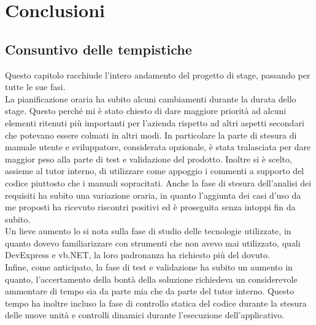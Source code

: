 
\chapter{Conclusioni}
\label{cap:conclusioni}
\section{Consuntivo delle tempistiche}
Questo capitolo racchiude l'intero andamento del progetto di stage, passando per tutte le sue fasi.\\
La pianificazione oraria ha subito alcuni cambiamenti durante la durata dello stage. Questo perché mi è stato chiesto di dare maggiore priorità ad alcuni elementi ritenuti 
più importanti per l'azienda rispetto ad altri aspetti secondari che potevano essere colmati in altri modi. In particolare la parte di stesura di manuale utente e sviluppatore,
considerata opzionale, è stata tralasciata per dare maggior peso alla parte di test e validazione del prodotto. Inoltre si è scelto, assieme al tutor interno, di utilizzare
come appoggio i commenti a supporto del codice piuttosto che i manuali sopracitati. Anche la fase di stesura dell'analisi dei requisiti ha subito una variazione oraria, in quanto
l'aggiunta dei casi d'uso da me proposti ha ricevuto riscontri positivi ed è proseguita senza intoppi fin da subito.\\ Un lieve aumento lo si nota sulla fase di studio delle
tecnologie utilizzate, in quanto dovevo familiarizzare con strumenti che non avevo mai utilizzato, quali DevExpress e vb.NET, la loro padronanza ha richiesto più del dovuto.\\
Infine, come anticipato, la fase di test e validazione ha subito un aumento in quanto, l'accertamento della bontà della soluzione richiedeva un considerevole ammontare di tempo
sia da parte mia che da parte del tutor interno. Questo tempo ha inoltre incluso la fase di controllo statica del codice durante la stesura delle nuove unità e controlli dinamici
durante l'esecuzione dell'applicativo.
\newpage


